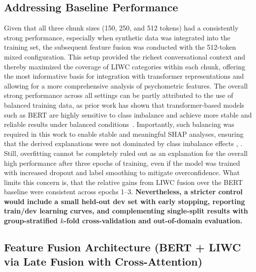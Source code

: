 \subsection{Addressing Baseline Performance}
Given that all three chunk sizes (150, 250, and 512 tokens) had a consistently strong performance, especially when synthetic data was integrated into the training set, the subsequent feature fusion was conducted with the 512-token mixed configuration. This setup provided the richest conversational context and thereby maximized the coverage of LIWC categories within each chunk, offering the most informative basis for integration with transformer representations and allowing for a more comprehensive analysis of psychometric features. The overall strong performance across all settings can be partly attributed to the use of balanced training data, as prior work has shown that transformer-based models such as BERT are highly sensitive to class imbalance and achieve more stable and reliable results under balanced conditions~\cite{henningnlpclassimbalance2023}. Importantly, such balancing was required in this work to enable stable and meaningful SHAP analyses, ensuring that the derived explanations were not dominated by class imbalance effects \parencite{liu2022balancedbackgroundexplanationdata}, \parencite{chen2024interpretable}. Still, overfitting cannot be completely ruled out as an explanation for the overall high performance after three epochs of training, even if the model was trained with increased dropout and label smoothing to mitigate overconfidence. What limits this concern is, that the relative gains from LIWC fusion over the BERT baseline were consistent across epochs 1–3. \textbf{Nevertheless, a stricter control would include a small held-out dev set with early stopping, reporting train/dev learning curves, and complementing single-split results with group-stratified $k$-fold cross-validation and out-of-domain evaluation.}


\subsection{Feature Fusion Architecture (BERT + LIWC via Late Fusion with Cross-Attention)}

